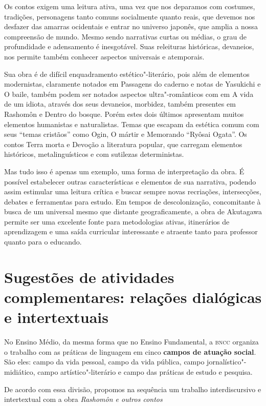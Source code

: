 \documentclass[12pt]{extarticle}
\begin{document}
Os contos exigem uma leitura ativa, uma vez que nos deparamos com
costumes, tradições, personagens tanto comuns socialmente quanto reais,
que devemos nos desfazer das amarras ocidentais e entrar no universo
japonês, que amplia a nossa compreensão de mundo. Mesmo sendo narrativas
curtas ou médias, o grau de profundidade e adensamento é inesgotável.
Suas releituras históricas, devaneios, nos permite também conhecer
aspectos universais e atemporais.

Sua obra é de difícil enquadramento estético"-literário, pois além de
elementos modernistas, claramente notados em Passagens do caderno e
notas de Yasukichi e O baile, também podem ser notados aspectos
ultra"-românticos com em A vida de um idiota, através dos seus devaneios,
morbidez, também presentes em Rashomôn e Dentro do bosque. Porém estes
dois últimos apresentam muitos elementos humanistas e naturalistas.
Temas que escapam da estética comum com seus ``temas cristãos'' como
Ogin, O mártir e Memorando ``Ryôsai Ogata''. Os contos Terra morta e
Devoção a literatura popular, que carregam elementos históricos,
metalinguísticos e com sutilezas deterministas.

Mas tudo isso é apenas um exemplo, uma forma de interpretação da obra. É
possível estabelecer outras características e elementos de sua
narrativa, podendo assim estimular uma leitura crítica e buscar sempre
novas recriações, intersecções, debates e ferramentas para estudo. Em
tempos de descolonização, concomitante à busca de um universal mesmo que
distante geograficamente, a obra de Akutagawa permite ser uma excelente
fonte para metodologias ativas, itinerários de aprendizagem e uma saída
curricular interessante e atraente tanto para professor quanto para o
educando.

\section{Sugestões de atividades complementares: relações dialógicas e
intertextuais}


No Ensino Médio, da mesma forma que no Ensino Fundamental, a \textsc{bncc}
organiza o trabalho com as práticas de linguagem em cinco \textbf{campos
de atuação social}. São eles: campo da vida pessoal, campo da vida
pública, campo jornalístico"-midiático, campo artístico"-literário e campo
das práticas de estudo e pesquisa.

De acordo com essa divisão, propomos na sequência um trabalho
interdiscursivo e intertextual com a obra \emph{Rashomôn e outros
contos}
\end{document}
